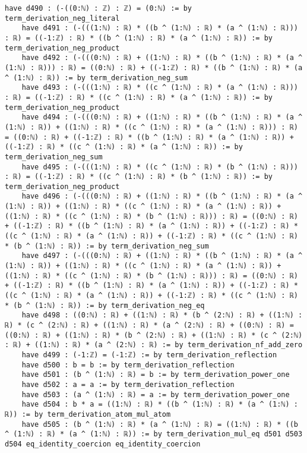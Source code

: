 \documentclass{article}
\begin{document}
\begin{tcolorbox}[colback=white!10, width=\linewidth]
\begin{lstlisting}[language=Lean4]
    have d490 : (-((0:ℕ) : ℤ) : ℤ) = (0:ℕ) := by term_derivation_neg_literal
    have d491 : (-(((1:ℕ) : ℝ) * ((b ^ (1:ℕ) : ℝ) * (a ^ (1:ℕ) : ℝ))) : ℝ) = ((-1:ℤ) : ℝ) * ((b ^ (1:ℕ) : ℝ) * (a ^ (1:ℕ) : ℝ)) := by term_derivation_neg_product
    have d492 : (-(((0:ℕ) : ℝ) + ((1:ℕ) : ℝ) * ((b ^ (1:ℕ) : ℝ) * (a ^ (1:ℕ) : ℝ))) : ℝ) = ((0:ℕ) : ℝ) + ((-1:ℤ) : ℝ) * ((b ^ (1:ℕ) : ℝ) * (a ^ (1:ℕ) : ℝ)) := by term_derivation_neg_sum
    have d493 : (-(((1:ℕ) : ℝ) * ((c ^ (1:ℕ) : ℝ) * (a ^ (1:ℕ) : ℝ))) : ℝ) = ((-1:ℤ) : ℝ) * ((c ^ (1:ℕ) : ℝ) * (a ^ (1:ℕ) : ℝ)) := by term_derivation_neg_product
    have d494 : (-(((0:ℕ) : ℝ) + ((1:ℕ) : ℝ) * ((b ^ (1:ℕ) : ℝ) * (a ^ (1:ℕ) : ℝ)) + ((1:ℕ) : ℝ) * ((c ^ (1:ℕ) : ℝ) * (a ^ (1:ℕ) : ℝ))) : ℝ) = ((0:ℕ) : ℝ) + ((-1:ℤ) : ℝ) * ((b ^ (1:ℕ) : ℝ) * (a ^ (1:ℕ) : ℝ)) + ((-1:ℤ) : ℝ) * ((c ^ (1:ℕ) : ℝ) * (a ^ (1:ℕ) : ℝ)) := by term_derivation_neg_sum
    have d495 : (-(((1:ℕ) : ℝ) * ((c ^ (1:ℕ) : ℝ) * (b ^ (1:ℕ) : ℝ))) : ℝ) = ((-1:ℤ) : ℝ) * ((c ^ (1:ℕ) : ℝ) * (b ^ (1:ℕ) : ℝ)) := by term_derivation_neg_product
    have d496 : (-(((0:ℕ) : ℝ) + ((1:ℕ) : ℝ) * ((b ^ (1:ℕ) : ℝ) * (a ^ (1:ℕ) : ℝ)) + ((1:ℕ) : ℝ) * ((c ^ (1:ℕ) : ℝ) * (a ^ (1:ℕ) : ℝ)) + ((1:ℕ) : ℝ) * ((c ^ (1:ℕ) : ℝ) * (b ^ (1:ℕ) : ℝ))) : ℝ) = ((0:ℕ) : ℝ) + ((-1:ℤ) : ℝ) * ((b ^ (1:ℕ) : ℝ) * (a ^ (1:ℕ) : ℝ)) + ((-1:ℤ) : ℝ) * ((c ^ (1:ℕ) : ℝ) * (a ^ (1:ℕ) : ℝ)) + ((-1:ℤ) : ℝ) * ((c ^ (1:ℕ) : ℝ) * (b ^ (1:ℕ) : ℝ)) := by term_derivation_neg_sum
    have d497 : (-(((0:ℕ) : ℝ) + ((1:ℕ) : ℝ) * ((b ^ (1:ℕ) : ℝ) * (a ^ (1:ℕ) : ℝ)) + ((1:ℕ) : ℝ) * ((c ^ (1:ℕ) : ℝ) * (a ^ (1:ℕ) : ℝ)) + ((1:ℕ) : ℝ) * ((c ^ (1:ℕ) : ℝ) * (b ^ (1:ℕ) : ℝ))) : ℝ) = ((0:ℕ) : ℝ) + ((-1:ℤ) : ℝ) * ((b ^ (1:ℕ) : ℝ) * (a ^ (1:ℕ) : ℝ)) + ((-1:ℤ) : ℝ) * ((c ^ (1:ℕ) : ℝ) * (a ^ (1:ℕ) : ℝ)) + ((-1:ℤ) : ℝ) * ((c ^ (1:ℕ) : ℝ) * (b ^ (1:ℕ) : ℝ)) := by term_derivation_neg_eq
    have d498 : ((0:ℕ) : ℝ) + ((1:ℕ) : ℝ) * (b ^ (2:ℕ) : ℝ) + ((1:ℕ) : ℝ) * (c ^ (2:ℕ) : ℝ) + ((1:ℕ) : ℝ) * (a ^ (2:ℕ) : ℝ) + ((0:ℕ) : ℝ) = ((0:ℕ) : ℝ) + ((1:ℕ) : ℝ) * (b ^ (2:ℕ) : ℝ) + ((1:ℕ) : ℝ) * (c ^ (2:ℕ) : ℝ) + ((1:ℕ) : ℝ) * (a ^ (2:ℕ) : ℝ) := by term_derivation_nf_add_zero
    have d499 : (-1:ℤ) = (-1:ℤ) := by term_derivation_reflection
    have d500 : b = b := by term_derivation_reflection
    have d501 : (b ^ (1:ℕ) : ℝ) = b := by term_derivation_power_one
    have d502 : a = a := by term_derivation_reflection
    have d503 : (a ^ (1:ℕ) : ℝ) = a := by term_derivation_power_one
    have d504 : b * a = ((1:ℕ) : ℝ) * ((b ^ (1:ℕ) : ℝ) * (a ^ (1:ℕ) : ℝ)) := by term_derivation_atom_mul_atom
    have d505 : (b ^ (1:ℕ) : ℝ) * (a ^ (1:ℕ) : ℝ) = ((1:ℕ) : ℝ) * ((b ^ (1:ℕ) : ℝ) * (a ^ (1:ℕ) : ℝ)) := by term_derivation_mul_eq d501 d503 d504 eq_identity_coercion eq_identity_coercion

\end{lstlisting}
\end{tcolorbox}
\end{document}
